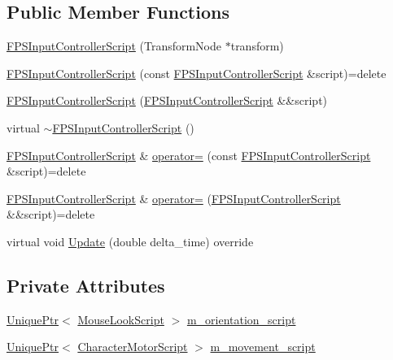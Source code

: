 \subsection*{Public Member Functions}
\begin{DoxyCompactItemize}
\item 
\hyperlink{classmage_1_1_f_p_s_input_controller_script_afb654c7011472ef300658503efaf1767}{F\+P\+S\+Input\+Controller\+Script} (Transform\+Node $\ast$transform)
\item 
\hyperlink{classmage_1_1_f_p_s_input_controller_script_ad47bd24645ec8a7b08c3048c92ed56fd}{F\+P\+S\+Input\+Controller\+Script} (const \hyperlink{classmage_1_1_f_p_s_input_controller_script}{F\+P\+S\+Input\+Controller\+Script} \&script)=delete
\item 
\hyperlink{classmage_1_1_f_p_s_input_controller_script_ad6919f0f67c16499ac467d400f96a4b5}{F\+P\+S\+Input\+Controller\+Script} (\hyperlink{classmage_1_1_f_p_s_input_controller_script}{F\+P\+S\+Input\+Controller\+Script} \&\&script)
\item 
virtual \hyperlink{classmage_1_1_f_p_s_input_controller_script_aab7082be73c735e0977e9efbbca72d98}{$\sim$\+F\+P\+S\+Input\+Controller\+Script} ()
\item 
\hyperlink{classmage_1_1_f_p_s_input_controller_script}{F\+P\+S\+Input\+Controller\+Script} \& \hyperlink{classmage_1_1_f_p_s_input_controller_script_a226a1fb2eecbd7ecdf2033a8f5460e8b}{operator=} (const \hyperlink{classmage_1_1_f_p_s_input_controller_script}{F\+P\+S\+Input\+Controller\+Script} \&script)=delete
\item 
\hyperlink{classmage_1_1_f_p_s_input_controller_script}{F\+P\+S\+Input\+Controller\+Script} \& \hyperlink{classmage_1_1_f_p_s_input_controller_script_adac34abea3d474bf8183c2555dde9034}{operator=} (\hyperlink{classmage_1_1_f_p_s_input_controller_script}{F\+P\+S\+Input\+Controller\+Script} \&\&script)=delete
\item 
virtual void \hyperlink{classmage_1_1_f_p_s_input_controller_script_ab78955a67341970a41b21ae943b81585}{Update} (double delta\+\_\+time) override
\end{DoxyCompactItemize}
\subsection*{Private Attributes}
\begin{DoxyCompactItemize}
\item 
\hyperlink{namespacemage_a8c307fbcc33bce9b7f2aa4c26c3b95cf}{Unique\+Ptr}$<$ \hyperlink{classmage_1_1_mouse_look_script}{Mouse\+Look\+Script} $>$ \hyperlink{classmage_1_1_f_p_s_input_controller_script_a22d47829d2bf8ef73d20e531b3be4165}{m\+\_\+orientation\+\_\+script}
\item 
\hyperlink{namespacemage_a8c307fbcc33bce9b7f2aa4c26c3b95cf}{Unique\+Ptr}$<$ \hyperlink{classmage_1_1_character_motor_script}{Character\+Motor\+Script} $>$ \hyperlink{classmage_1_1_f_p_s_input_controller_script_adef81e743004c4c182ceb71f9bc35ab6}{m\+\_\+movement\+\_\+script}
\end{DoxyCompactItemize}
